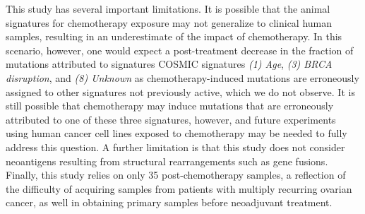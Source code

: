 This study has several important limitations. It is possible that the animal signatures for chemotherapy exposure may not generalize to clinical human samples, resulting in an underestimate of the impact of chemotherapy. In this scenario, however, one would expect a post-treatment decrease in the fraction of mutations attributed to signatures COSMIC signatures \textit{(1) Age}, \textit{(3) BRCA disruption}, and \textit{(8) Unknown} as chemotherapy-induced mutations are erroneously assigned to other signatures not previously active, which we do not observe. It is still possible that chemotherapy may induce mutations that are erroneously attributed to one of these three signatures, however, and future experiments using human cancer cell lines exposed to chemotherapy may be needed to fully address this question. A further limitation is that this study does not consider neoantigens resulting from structural rearrangements such as gene fusions. Finally, this study relies on only 35 post-chemotherapy samples, a reflection of the difficulty of acquiring samples from patients with multiply recurring ovarian cancer, as well in obtaining primary samples before neoadjuvant treatment.



